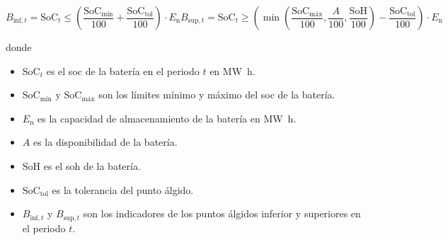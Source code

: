 \begin{samepage}

  \begin{subequations}%
    \label{eq:puntos-algidos-inf-sup}

    \begin{equation}
      B_{\text{inf}, t} = \mathrm{SoC}_{t} \le \left( \frac{\mathrm{SoC}_{\text{mín}}}{100} + \frac{\mathrm{SoC}_{\text{tol}}}{100} \right) \cdot E_{\mathrm{n}}
    \end{equation}

    \begin{equation}
      B_{\text{sup}, t} = \mathrm{SoC}_{t} \ge \left( \min\left(\frac{\mathrm{SoC}_{\text{máx}}}{100}, \frac{A}{100}, \frac{\mathrm{SoH}}{100}\right) - \frac{\mathrm{SoC}_{\text{tol}}}{100} \right) \cdot E_{\mathrm{n}}
    \end{equation}

  \end{subequations}

  donde

  \begin{itemize}

    \item \( \mathrm{SoC}_{t} \) es el \gls{soc} de la batería en el periodo \( t \) en \si{{\mega\watt\hour}}.

    \item \( \mathrm{SoC}_{\text{mín}} \) y \( \mathrm{SoC}_{\text{máx}} \) son los límites mínimo y máximo del \gls{soc} de la batería.

    \item \( E_{\mathrm{n}} \) es la capacidad de almacenamiento de la batería en \si{{\mega\watt\hour}}.

    \item \( A \) es la disponibilidad de la batería.

    \item \( \mathrm{SoH} \) es el \gls{soh} de la batería.

    \item \( \mathrm{SoC}_{\text{tol}} \) es la tolerancia del punto álgido.

    \item \( B_{\text{inf}, t} \) y \( B_{\text{sup}, t} \) son los indicadores de los puntos álgidos inferior y superiores en el periodo \( t \).

  \end{itemize}

\end{samepage}

